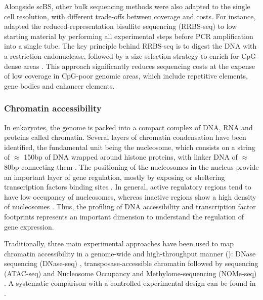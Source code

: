 Alongside scBS, other bulk sequencing methods were also adapted to the single cell resolution, with different trade-offs between coverage and costs. For instance, \cite{Guo2015} adapted the reduced-representation bisulfite sequencing (RRBS-seq) to low starting material by performing all experimental steps before PCR amplification into a single tube. The key principle behind RRBS-seq is to digest the DNA with a restriction endonuclease, followed by a size-selection strategy to enrich for CpG-dense areas \cite{Meissner2005}. This approach significantly reduces sequencing costs at the expense of low coverage in CpG-poor genomic areas, which include repetitive elements, gene bodies and enhancer elements.

\subsubsection{Chromatin accessibility} \label{section:chromatin_accessibility}

In eukaryotes, the genome is packed into a compact complex of DNA, RNA and proteins called chromatin. Several layers of chromatin condensation have been identified, the fundamental unit being the nucleosome, which consists on a string of $\approx$  150bp of DNA wrapped around histone proteins, with linker DNA of $\approx$ 80bp connecting them \cite{Klemm2019,Tsompana2014}. The positioning of the nucleosomes in the nucleus provide an important layer of gene regulation, mostly by exposing or sheltering transcription factors binding sites \cite{Jiang2009}. In general, active regulatory regions tend to have low occupancy of nucleosomes, whereas inactive regions show a high density of nucleosomes \cite{Struhl2013}. Thus, the profiling of DNA accessibility and transcription factor footprints represents an important dimension to understand the regulation of gene expression.


Traditionally, three main experimental approaches have been used to map chromatin accessibility in a genome-wide and high-throughput manner (): DNase sequencing (DNase-seq) \cite{Song2010}, transposase-accessible chromatin followed by sequencing (ATAC-seq) \cite{Buenrostro2013} and Nucleosome Occupancy and Methylome-sequencing (NOMe-seq) \cite{Kelly2012}. A systematic comparison with a controlled experimental design can be found in \cite{Nordstrom2019}.

